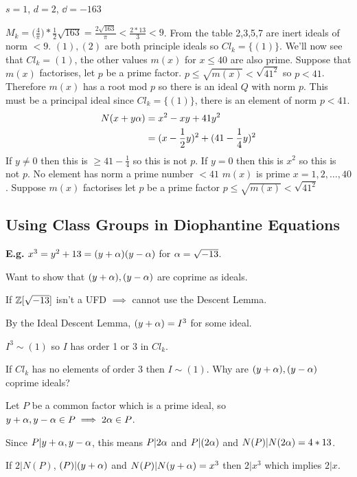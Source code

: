 \documentclass[11pt]{article}
\begin{document}
$s=1$, $d=2$, $\dd =-163$
\spa

$M_k = \big( \frac4\pi \big) * \frac{1}{2} \sqrt{163} = \frac{2\sqrt{163}}{\pi} < \frac{2*13}{3} < 9$.
\spac
From the table 2,3,5,7 are inert ideals of norm $<9$.
\spac
$ (1), (2) $ are both principle ideals so $Cl_k = \{(1)\}$.
\spac
We'll now see that $Cl_k= (1)$, the other values $m(x)$ for $x\leq 40$ are also prime.
Suppose that $m(x)$ factorises, let $p$ be a prime factor.
\spac
$p \leq \sqrt{m(x)} < \sqrt{41^2}$ so $p<41$.
\spac
Therefore $m(x) $ has a root mod $p$ so there is an ideal $Q$ with norm $p$.
\spac
This must be a principal ideal since $Cl_k = \{(1) \}$, there is an element of norm $p < 41$.
\begin{align*}
	N(x+y\alpha) &= x^2 -xy + 41y^2\\
	&= (x- \frac{1}{2} y)^2 + (41 - \frac14 y)^2
\end{align*}
\spa
If $y \neq 0$ then this is $\geq 41 -\frac{1}{4}$ \lightning so this is not $p$.
\spac
If $y= 0 $ then this is $x^2$ so this is not $p$.
\spac
No element has norm a prime number $<41$ \lightning
\spac
$m(x)$ is prime $x= 1,2,\dots, 40$.
Suppose $m(x)$ factorises let $p$ be a prime factor $p \leq \sqrt{m(x)} < \sqrt{41^2}$




\subsection{Using Class Groups in Diophantine Equations}

\textbf{E.g.} $x^3 = y^2 + 13 = (y+ \alpha) (y- \alpha)$ for $\alpha = \sqrt{-13}$.

Want to show that $(y+\alpha), (y - \alpha)$ are coprime as ideals.
\spa

If $\mathbb{Z}[\sqrt{-13}]$ isn't a UFD $\implies $ cannot use the Descent Lemma.
\spa

By the Ideal Descent Lemma, $(y+\alpha) = I^3$ for some ideal.
\spa

$I^3 \sim (1) $ so $I$ has order 1 or 3 in $Cl_k$.
\spa

If $Cl_k$ has no elements of order 3 then $I \sim (1)$.
\spac
Why are $(y+ \alpha), (y-\alpha)$ coprime ideals?
\spa

Let $P$ be a common factor which is a prime ideal, so $y+\alpha, y-\alpha \in P \implies 2\alpha \in P$.
\spa

Since $P | y+\alpha, y-\alpha$, this means $P | 2\alpha$ and $P | (2\alpha)$ and $N(P) |N(2\alpha) = 4*13$.
\spa

If $2 | N(P)$, $(P) |(y + \alpha)$ and $N(P) | N(y+\alpha) = x^3$ then $2 | x^3 $ which implies $2|x$.
\spa
\end{document}
